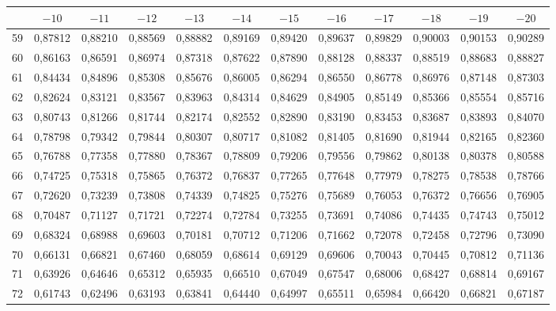 \documentclass[12pt,a4paper]{article}
\begin{document}
\begin{center}
\footnotesize
\begin{tabular}{|c|c|c|c|c|c|c|c|c|c|c|c|}
\hline
 & $-10$ & $-11$ & $-12$ & $-13$ & $-14$ & $-15$ & $-16$ & $-17$ & $-18$ & $-19$ & $-20$ \\
\hline
59 & 0,87812 & 0,88210 & 0,88569 & 0,88882 & 0,89169 & 0,89420 & 0,89637 & 0,89829 & 0,90003 & 0,90153 & 0,90289 \\
60 & 0,86163 & 0,86591 & 0,86974 & 0,87318 & 0,87622 & 0,87890 & 0,88128 & 0,88337 & 0,88519 & 0,88683 & 0,88827 \\
61 & 0,84434 & 0,84896 & 0,85308 & 0,85676 & 0,86005 & 0,86294 & 0,86550 & 0,86778 & 0,86976 & 0,87148 & 0,87303 \\
62 & 0,82624 & 0,83121 & 0,83567 & 0,83963 & 0,84314 & 0,84629 & 0,84905 & 0,85149 & 0,85366 & 0,85554 & 0,85716 \\
63 & 0,80743 & 0,81266 & 0,81744 & 0,82174 & 0,82552 & 0,82890 & 0,83190 & 0,83453 & 0,83687 & 0,83893 & 0,84070 \\
64 & 0,78798 & 0,79342 & 0,79844 & 0,80307 & 0,80717 & 0,81082 & 0,81405 & 0,81690 & 0,81944 & 0,82165 & 0,82360 \\
65 & 0,76788 & 0,77358 & 0,77880 & 0,78367 & 0,78809 & 0,79206 & 0,79556 & 0,79862 & 0,80138 & 0,80378 & 0,80588 \\
66 & 0,74725 & 0,75318 & 0,75865 & 0,76372 & 0,76837 & 0,77265 & 0,77648 & 0,77979 & 0,78275 & 0,78538 & 0,78766 \\
67 & 0,72620 & 0,73239 & 0,73808 & 0,74339 & 0,74825 & 0,75276 & 0,75689 & 0,76053 & 0,76372 & 0,76656 & 0,76905 \\
68 & 0,70487 & 0,71127 & 0,71721 & 0,72274 & 0,72784 & 0,73255 & 0,73691 & 0,74086 & 0,74435 & 0,74743 & 0,75012 \\
69 & 0,68324 & 0,68988 & 0,69603 & 0,70181 & 0,70712 & 0,71206 & 0,71662 & 0,72078 & 0,72458 & 0,72796 & 0,73090 \\
70 & 0,66131 & 0,66821 & 0,67460 & 0,68059 & 0,68614 & 0,69129 & 0,69606 & 0,70043 & 0,70445 & 0,70812 & 0,71136 \\
71 & 0,63926 & 0,64646 & 0,65312 & 0,65935 & 0,66510 & 0,67049 & 0,67547 & 0,68006 & 0,68427 & 0,68814 & 0,69167 \\
72 & 0,61743 & 0,62496 & 0,63193 & 0,63841 & 0,64440 & 0,64997 & 0,65511 & 0,65984 & 0,66420 & 0,66821 & 0,67187 \\
\hline
\end{tabular}
\end{center}
\end{document}
